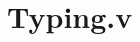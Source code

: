 \documentclass[DIV=26]{scrartcl}
\begin{document}
\section*{Typing.v}
\inputminted[linenos, style=bw, breaklines]{coq}{Typing.v}
\end{document}
